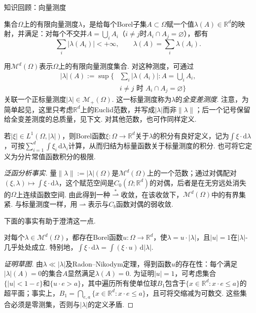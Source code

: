 \begin{sourcebox}{知识回顾：向量测度}\label{box:4.2}
\begin{definition*}
集合$\Omega$上的有限向量测度$\lambda$，是给每个Borel子集$A\subset\Omega$赋一个值$\lambda(A)\in\mathbb R^d$的映射，并满足：对每个不交并$A=\bigcup_iA_i$（$i\neq j$时$A_i\cap A_j=\varnothing$），都有
\[
 \sum_i|\lambda(A_i)|<+\infty,\qquad
 \lambda(A)=\sum_i\lambda(A_i).
\]
\end{definition*}
用$\mathscr M^d(\Omega)$表示$\Omega$上的有限向量测度集合. 对这种测度，可通过
\begin{equation*}
\begin{aligned}
 |\lambda|(A):=\sup\biggl\{&\sum_i|\lambda(A_i)|:
        A=\bigcup_iA_i,\\
       &i\neq j\text{ 时 }A_i\cap A_j=\varnothing\biggr\}
\end{aligned}
\end{equation*}
关联一个正标量测度$|\lambda|\in\mathscr M_+(\Omega)$. 这一标量测度称为$\lambda$的\emph{全变差测度}. 注意，为简单起见，这里只考虑$\mathbb R^d$上的Euclid范数，并写成$|\lambda|$而非$\|\lambda\|$；后一个记号保留给全变差测度的总质量，见下文. 对其他范数，也可作同样定义.

若$|\xi|\in L^1(\Omega,|\lambda|)$，则Borel函数$\xi:\Omega\to\mathbb R^d$关于$\lambda$的积分有良好定义，记为$\int\xi\cdot\mathrm d\lambda$，可按$\sum_{i=1}^d\int\xi_i\,\mathrm d\lambda_i$计算，从而归结为标量函数关于标量测度的积分. 也可将它定义为分片常值函数积分的极限.

\emph{泛函分析事实.} 量$\|\lambda\|:=|\lambda|(\Omega)$是$\mathscr M^d(\Omega)$上的一个范数；通过对偶配对$(\xi,\lambda)\mapsto\int\xi\cdot\mathrm d\lambda$，这个赋范空间是$C_0(\Omega;\mathbb R^d)$的对偶，后者是在无穷远处消失的$\Omega$上连续函数空间. 由此得到一种$\overset{*}{\rightharpoonup}$收敛，在该收敛下，$\mathscr M^d(\Omega)$中的有界集紧. 与标量测度一样，用$\rightharpoonup$表示与$C_b$函数对偶的弱收敛.

下面的事实有助于澄清这一点.
\begin{proposition*}
对每个$\lambda\in\mathscr M^d(\Omega)$，都存在Borel函数$u:\Omega\to\mathbb R^d$，使$\lambda=u\cdot|\lambda|$，且$|u|=1$在$|\lambda|$-几乎处处成立. 特别地，$\int\xi\cdot\mathrm d\lambda=\int(\xi\cdot u)\,\mathrm d|\lambda|$.
\end{proposition*}
\begin{proof}[证明草图]
由$\lambda\ll|\lambda|$及Radon--Nikodym定理，得到函数$u$的存在性：每个满足$|\lambda|(A)=0$的集合$A$显然满足$\lambda(A)=0$. 为证明$|u|=1$，可考虑集合$\{|u|<1-\varepsilon\}$和$\{u\cdot e>a\}$，其中遍历所有使单位球$B_1$包含于$\{x\in\mathbb R^d:x\cdot e\leq a\}$的超平面；事实上，$B_1=\bigcap_{e,a}\{x\in\mathbb R^d:x\cdot e\leq a\}$，且可将交缩减为可数交. 这些集合必须是零测集，否则与$|\lambda|$的定义矛盾.
\end{proof}
\end{sourcebox}

